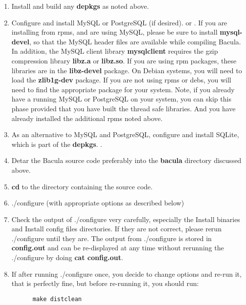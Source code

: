 \begin{enumerate}
\item Install and build any {\bf depkgs} as noted above.  
\item Configure and install MySQL or PostgreSQL (if desired). 
    or  
   .  If you are installing from rpms, and are
   using MySQL, please be sure to install  {\bf mysql-devel}, so that the MySQL
   header files are available  while compiling Bacula. In addition, the MySQL
   client  library {\bf mysqlclient} requires the gzip compression library  {\bf
   libz.a} or {\bf libz.so}. If you are using rpm packages,  these libraries are
   in the {\bf libz-devel} package. On Debian  systems, you will need to load the
   {\bf zlib1g-dev} package. If  you are not using rpms or debs, you will need to
   find the  appropriate package for your system.  
   Note, if you already have a running MySQL or PostgreSQL on your system, you 
   can skip this phase provided that you have built the thread  safe libraries.
   And you have already installed the additional  rpms noted above.  
\item As an alternative to MySQL and PostgreSQL, configure and install SQLite,
    which is part of the {\bf depkgs}.  
   .  
   \item Detar the Bacula source code preferably into the {\bf bacula}  directory
   discussed above.  
\item {\bf cd} to the directory containing the source code.  
\item ./configure (with appropriate options as described below)  
\item Check the output of ./configure very carefully, especially  the Install
   binaries and Install config files directories.  If they are not correct,
   please rerun ./configure until they  are. The output from ./configure is
   stored in {\bf config.out}  and can be re-displayed at any time without
   rerunning the  ./configure by doing {\bf cat config.out}.  
\item If after running ./configure once, you decide to change options  and
   re-run it, that is perfectly fine, but before re-running it,  you should run: 


\footnotesize
\begin{verbatim}
      make distclean
      
\end{verbatim}
\normalsize


\end{enumerate}
